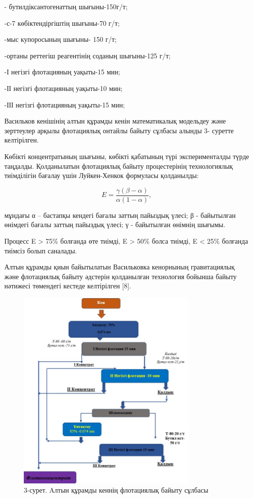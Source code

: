 \begin{multicols}{2}
- бутилдіксантогенаттың шығыны-150г/т;

-с-7 көбіктендіргіштің шығыны-70 г/т;

-мыс купоросының шығыны- 150 г/т;

-ортаны реттегіш реагентінің соданың шығыны-125 г/т;

-І негізгі флотацияның уақыты-15 мин;

-ІІ негізгі флотацияның уақыты-10 мин;

-ІІІ негізгі флотацияның уақыты-15 мин;

Васильков кенішінің алтын құрамды кенін математикалық модельдеу және
зерттеулер арқылы флотациялық онтайлы байыту сұлбасы алынды 3- суретте
келтірілген.

Көбікті концентратының шығыны, көбікті қабатының түрі эксперименталды
түрде таңдалды. Қолданылатын флотациялық байыту процестерінің
технологиялық тиімділігін бағалау үшін Луйкен-Хенкок формуласы
қолданылды:

\[E = \frac{\gamma(\beta - \alpha)}{\alpha(1 - \alpha)},\]

мұндағы α -- бастапқы кендегі бағалы заттың пайыздық үлесі; β -
байытылған өнімдегі бағалы заттың пайыздық үлесі; γ - байытылған өнімнің
шығымы.

Процесс E \textgreater{} 75\% болғанда өте тиімді, E \textgreater{} 50\%
болса тиімді, E \textless{} 25\% болғанда тиімсіз болып саналады.

Алтын құрамды қиын байытылатын Васильковка кенорнының гравитациялық және
флотациялық байыту әдстерін қолданылған технология бойынша байыту
нәтижесі төмендегі кестеде келтірілген {[}8{]}.
\end{multicols}

\begin{figure}[H]
	\centering
	\includegraphics[width=0.8\textwidth]{media/gor/image5}
	\caption*{3-сурет. Aлтын құрамды кеннің флотациялық байыту сұлбасы}
\end{figure}


